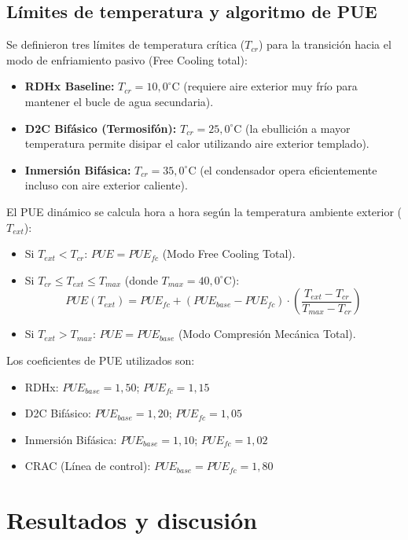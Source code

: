 \documentclass[journal]{IEEEtran}
\begin{document}
\subsection{L\'imites de temperatura y algoritmo de PUE}
Se definieron tres l\'imites de temperatura cr\'itica ($T_{cr}$) para la transici\'on hacia el modo de enfriamiento pasivo (Free Cooling total):
\begin{itemize}
    \item \textbf{RDHx Baseline:} $T_{cr} = 10,0^\circ\text{C}$ (requiere aire exterior muy fr\'io para mantener el bucle de agua secundaria).
    \item \textbf{D2C Bif\'asico (Termosif\'on):} $T_{cr} = 25,0^\circ\text{C}$ (la ebullici\'on a mayor temperatura permite disipar el calor utilizando aire exterior templado).
    \item \textbf{Inmersi\'on Bif\'asica:} $T_{cr} = 35,0^\circ\text{C}$ (el condensador opera eficientemente incluso con aire exterior caliente).
\end{itemize}

El PUE din\'amico se calcula hora a hora seg\'un la temperatura ambiente exterior ($T_{ext}$):
\begin{itemize}
    \item Si $T_{ext} < T_{cr}$: $PUE = PUE_{fc}$ (Modo Free Cooling Total).
    \item Si $T_{cr} \le T_{ext} \le T_{max}$ (donde $T_{max} = 40,0^\circ\text{C}$):
    \begin{equation}
    PUE(T_{ext}) = PUE_{fc} + (PUE_{base} - PUE_{fc}) \cdot \left( \frac{T_{ext} - T_{cr}}{T_{max} - T_{cr}} \right)
    \end{equation}
    \item Si $T_{ext} > T_{max}$: $PUE = PUE_{base}$ (Modo Compresi\'on Mec\'anica Total).
\end{itemize}

Los coeficientes de PUE utilizados son:
\begin{itemize}
    \item RDHx: $PUE_{base} = 1,50$; $PUE_{fc} = 1,15$
    \item D2C Bif\'asico: $PUE_{base} = 1,20$; $PUE_{fc} = 1,05$
    \item Inmersi\'on Bif\'asica: $PUE_{base} = 1,10$; $PUE_{fc} = 1,02$
    \item CRAC (L\'inea de control): $PUE_{base} = PUE_{fc} = 1,80$
\end{itemize}

\section{Resultados y discusi\'on}
\end{document}
